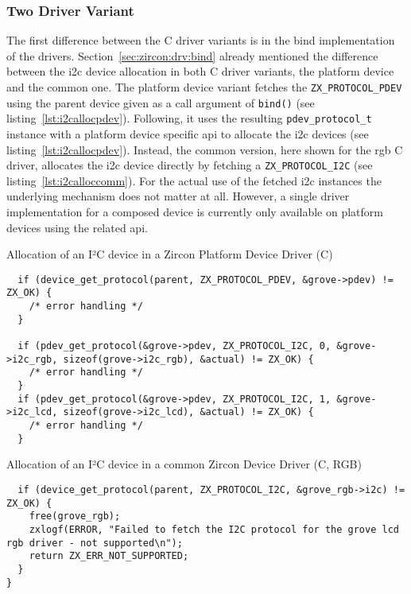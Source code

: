 \subsubsection*{Two Driver Variant} 
The first difference between the C driver variants is in the bind implementation of the drivers.
Section~\ref{sec:zircon:drv:bind} already mentioned the difference between the \ac{i2c} device allocation in both C driver variants, the platform device and the common one.
The platform device variant fetches the \texttt{ZX_PROTOCOL_PDEV} using the parent device given as a call argument of \texttt{bind()} (see listing~\ref{lst:i2callocpdev}). 
Following, it uses the resulting \texttt{pdev_protocol_t} instance with a platform device specific \ac{api} to allocate the \ac{i2c} devices (see listing~\ref{lst:i2callocpdev}).
Instead, the common version, here shown for the \ac{rgb} C driver, allocates the \ac{i2c} device directly by fetching a \texttt{ZX_PROTOCOL_I2C} (see listing~\ref{lst:i2calloccomm}).
For the actual use of the fetched \ac{i2c} instances the underlying mechanism does not matter at all.
However, a single driver implementation for a composed device is currently only available on platform devices using the related \ac{api}.
%
\begin{listing}[H]
\caption{Allocation of an I²C device in a Zircon Platform Device Driver (C)}
\label{lst:i2callocpdev}
\begin{verbatim}
  if (device_get_protocol(parent, ZX_PROTOCOL_PDEV, &grove->pdev) != ZX_OK) {
    /* error handling */
  }

  if (pdev_get_protocol(&grove->pdev, ZX_PROTOCOL_I2C, 0, &grove->i2c_rgb, sizeof(grove->i2c_rgb), &actual) != ZX_OK) {
    /* error handling */
  }
  if (pdev_get_protocol(&grove->pdev, ZX_PROTOCOL_I2C, 1, &grove->i2c_lcd, sizeof(grove->i2c_lcd), &actual) != ZX_OK) {
    /* error handling */
  }
\end{verbatim}
\end{listing}
%
\begin{listing}[H]
\caption{Allocation of an I²C device in a common Zircon Device Driver (C, RGB)}
\label{lst:i2calloccomm}
\begin{verbatim}
  if (device_get_protocol(parent, ZX_PROTOCOL_I2C, &grove_rgb->i2c) != ZX_OK) {
    free(grove_rgb);
    zxlogf(ERROR, "Failed to fetch the I2C protocol for the grove lcd rgb driver - not supported\n");
    return ZX_ERR_NOT_SUPPORTED;
  }
}
\end{verbatim}
\end{listing}
